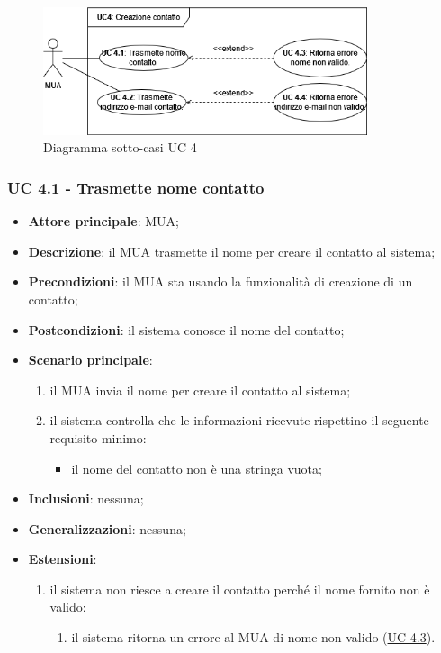 \begin{figure}[H]
    \includegraphics[width=0.85\textwidth]{sections/uc_imgs/UC04.png}
    \centering
    \caption{Diagramma sotto-casi UC 4}
\end{figure}

\subsubsection{UC 4.1 - Trasmette nome contatto} \label{sec:UC4.1}
    \begin{itemize}
        \item \textbf{Attore principale}: MUA;
        \item \textbf{Descrizione}: il MUA trasmette il nome per creare il contatto al sistema;
        \item \textbf{Precondizioni}: il MUA sta usando la funzionalità di creazione di un contatto;
        \item \textbf{Postcondizioni}: il sistema conosce il nome del contatto;
        \item \textbf{Scenario principale}:
            \begin{enumerate}
                \item il MUA invia il nome per creare il contatto al sistema;
                \item il sistema controlla che le informazioni ricevute rispettino il seguente requisito minimo:
                    \begin{itemize}
                        \item il nome del contatto non è una stringa vuota;
                    \end{itemize}
            \end{enumerate}
        \item \textbf{Inclusioni}: nessuna;
        \item \textbf{Generalizzazioni}: nessuna;
        \item \textbf{Estensioni}:
            \begin{enumerate}[label=\alph*.]
                \item il sistema non riesce a creare il contatto perché il nome fornito non è valido:
                \begin{enumerate}[label=\arabic*.]
                    \item il sistema ritorna un errore al MUA di nome non valido (\hyperref[sec:UC4.3]{UC 4.3}).
                \end{enumerate}
            \end{enumerate}
    \end{itemize}



